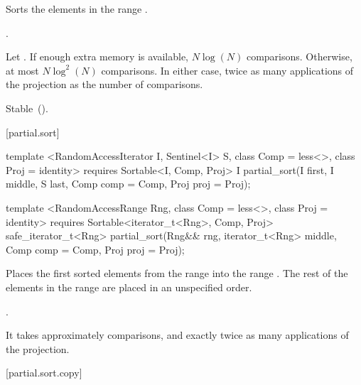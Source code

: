 \begin{itemdescr}
\pnum
\effects
Sorts the elements in the range .

\pnum
\returns {}.

\pnum
\complexity
Let .
If enough extra memory is available, $N \log(N)$ comparisons.
Otherwise, at most $N \log^2(N)$ comparisons.
In either case, twice as many applications of the projection as the number of
comparisons.

\pnum
\remarks Stable~().
\end{itemdescr}

[partial.sort]{}

%
\begin{itemdecl}
template <RandomAccessIterator I, Sentinel<I> S, class Comp = less<>,
    class Proj = identity>
  requires Sortable<I, Comp, Proj>
  I partial_sort(I first, I middle, S last, Comp comp = Comp{}, Proj proj = Proj{});

template <RandomAccessRange Rng, class Comp = less<>, class Proj = identity>
  requires Sortable<iterator_t<Rng>, Comp, Proj>
  safe_iterator_t<Rng>
    partial_sort(Rng&& rng, iterator_t<Rng> middle, Comp comp = Comp{},
                 Proj proj = Proj{});
\end{itemdecl}

\begin{itemdescr}
\pnum
\effects
Places the first
sorted elements from the range
into the range
.
The rest of the elements in the range
are placed in an unspecified order.
%

\pnum
\returns {}.

\pnum
\complexity
It takes approximately
comparisons, and exactly twice as many applications of the projection.
\end{itemdescr}

[partial.sort.copy]{}

